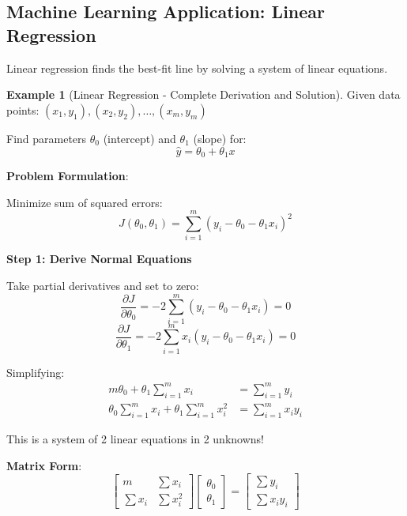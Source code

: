 \documentclass[12pt,a4paper]{article}
\theoremstyle{definition}
\newtheorem{example}{Example}[section]
\begin{document}
\subsection{Machine Learning Application: Linear Regression}

\begin{tcolorbox}[enhanced,breakable,colback=yellow!10!white,colframe=orange!75!black,title=ML Application: Ordinary Least Squares]
Linear regression finds the best-fit line by solving a system of linear equations.
\end{tcolorbox}

\begin{example}[Linear Regression - Complete Derivation and Solution]
Given data points: $(x_1, y_1), (x_2, y_2), \ldots, (x_m, y_m)$

Find parameters $\theta_0$ (intercept) and $\theta_1$ (slope) for:
\[
\hat{y} = \theta_0 + \theta_1 x
\]

\textbf{Problem Formulation}:

Minimize sum of squared errors:
\[
J(\theta_0, \theta_1) = \sum_{i=1}^{m} (y_i - \theta_0 - \theta_1 x_i)^2
\]

\textbf{Step 1: Derive Normal Equations}

Take partial derivatives and set to zero:
\[
\frac{\partial J}{\partial \theta_0} = -2\sum_{i=1}^{m} (y_i - \theta_0 - \theta_1 x_i) = 0
\]
\[
\frac{\partial J}{\partial \theta_1} = -2\sum_{i=1}^{m} x_i(y_i - \theta_0 - \theta_1 x_i) = 0
\]

Simplifying:
\begin{align}
m\theta_0 + \theta_1\sum_{i=1}^{m} x_i &= \sum_{i=1}^{m} y_i \\
\theta_0\sum_{i=1}^{m} x_i + \theta_1\sum_{i=1}^{m} x_i^2 &= \sum_{i=1}^{m} x_i y_i
\end{align}

This is a system of 2 linear equations in 2 unknowns!

\textbf{Matrix Form}:
\[
\begin{bmatrix}
m & \sum x_i \\
\sum x_i & \sum x_i^2
\end{bmatrix}
\begin{bmatrix}
\theta_0 \\ \theta_1
\end{bmatrix}
= \begin{bmatrix}
\sum y_i \\
\sum x_i y_i
\end{bmatrix}
\]


\end{example}
\end{document}
